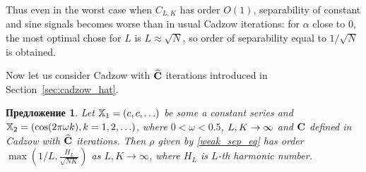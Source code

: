 \documentclass[12pt,a4paper,fleqn,leqno]{article}
\newtheorem{proposition}{Предложение}
\begin{document}
Thus even in the worst case when $C_{L,K}$ has order $O(1)$, separability of constant and sine signals becomes worse than in usual Cadzow iterations: for $\alpha$ close to 0, the most optimal chose for $L$ is $L \approx \sqrt{N}$, so order of separability equal to $1/\sqrt{N}$ is obtained.

Now let us consider Cadzow with $\widehat{\mathbf{C}}$ iterations introduced in Section~\ref{sec:cadzow_hat}.

\begin{proposition}
\label{prop:separ2}
Let $\mathbb{X}_1 = (c, c, \ldots)$ be some a constant series and $\mathbb{X}_2 = (\cos(2 \pi \omega k), k = 1, 2, \ldots)$, where $0<\omega <0.5$, $L,K\rightarrow \infty$ and $\mathbf{C}$ defined in Cadzow with $\widehat{\mathbf{C}}$ iterations.
 Then $\rho$ given by \eqref{weak_sep_eq} has order $\max \left(1/L, \frac{H_L}{\sqrt{NK}} \right)$ as $L, K \to \infty$, where $H_L$ is $L$-th harmonic number.
\end{proposition}
\end{document}
